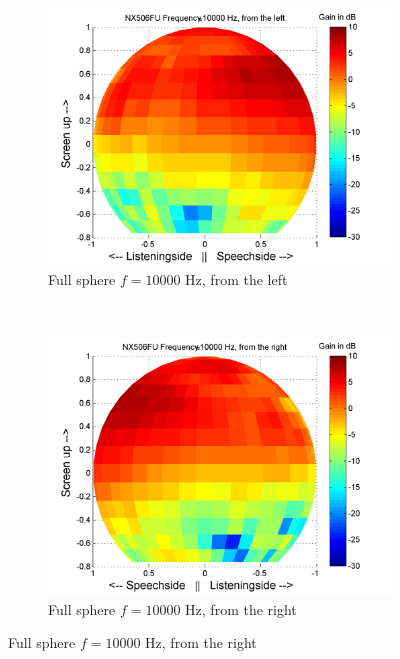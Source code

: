 \begin{figure}[t!]
        \begin{subfigure}[t]{0.5\textwidth}
			    \caption{Full sphere $f=10000$ Hz, from the left}
			    \label{fig:res_NX506_FU_sphere_left}
                \centering
    			\includegraphics[height=0.28\textheight]{afbeeldingen/plots/results/NX506FU_10000_left.png}
        \end{subfigure}~
        \begin{subfigure}[t]{0.5\textwidth}
			    \caption{Full sphere $f=10000$ Hz, from the right}
			    \label{fig:res_NX506_FU_sphere_right}
                \centering
    			\includegraphics[height=0.28\textheight]{afbeeldingen/plots/results/NX506FU_10000_right.png}
        \end{subfigure}
\end{figure}

